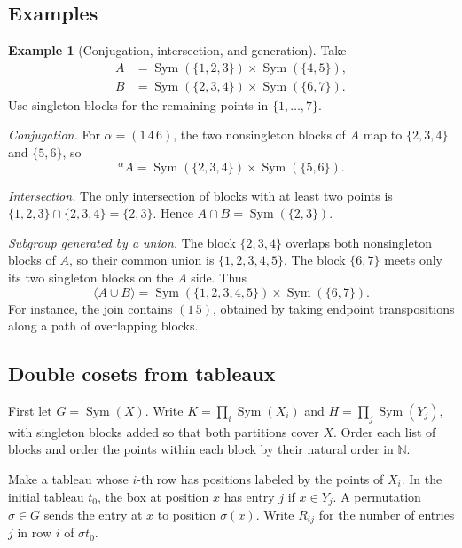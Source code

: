 \documentclass[11pt,a4paper]{article}
\numberwithin{equation}{section}
\theoremstyle{definition}
\newtheorem{example}{Example}[section]
\newcommand{\cg}[2]{{}^{#1}\!#2}
\begin{document}
\subsection{Examples}


\begin{example}[Conjugation, intersection, and generation]\label{ex:parabolic-block-operations}
Take
\[
 \begin{aligned}
 A&=\operatorname{Sym}(\{1,2,3\})\times\operatorname{Sym}(\{4,5\}),\\
 B&=\operatorname{Sym}(\{2,3,4\})\times\operatorname{Sym}(\{6,7\}).
 \end{aligned}
\]
Use singleton blocks for the remaining points in \(\{1,\ldots,7\}\).

\emph{Conjugation.} For \(\alpha=(1\,4\,6)\), the two nonsingleton
blocks of \(A\) map to \(\{2,3,4\}\) and \(\{5,6\}\), so
\[
 \cg{\alpha}{A}=
 \operatorname{Sym}(\{2,3,4\})\times\operatorname{Sym}(\{5,6\}).
\]

\emph{Intersection.} The only intersection of blocks with at least
two points is \(\{1,2,3\}\cap\{2,3,4\}=\{2,3\}\). Hence
\(A\cap B=\operatorname{Sym}(\{2,3\})\).

\emph{Subgroup generated by a union.} The block \(\{2,3,4\}\)
overlaps both nonsingleton blocks of \(A\), so their common union
is \(\{1,2,3,4,5\}\). The block \(\{6,7\}\) meets only its two
singleton blocks on the \(A\) side. Thus
\[
 \langle A\cup B\rangle
 =\operatorname{Sym}(\{1,2,3,4,5\})\times\operatorname{Sym}(\{6,7\}).
\]
For instance, the join contains \((1\,5)\), obtained by taking
endpoint transpositions along a path of overlapping blocks.
\end{example}

\subsection{Double cosets from tableaux}\label{sec:parabolic-double-cosets}

First let \(G=\operatorname{Sym}(X)\). Write \(K=\prod_i\operatorname{Sym}(X_i)\)
and \(H=\prod_j\operatorname{Sym}(Y_j)\), with singleton blocks added so that
both partitions cover \(X\). Order each list of blocks and order the points
within each block by their natural order in \(\mathbb N\).

Make a tableau whose \(i\)-th row has positions labeled by the points of
\(X_i\). In the initial tableau \(t_0\), the box at position \(x\) has
entry \(j\) if \(x\in Y_j\). A permutation \(\sigma\in G\) sends the
entry at \(x\) to position \(\sigma(x)\). Write \(R_{ij}\) for the number
of entries \(j\) in row \(i\) of \(\sigma t_0\).
\end{document}
